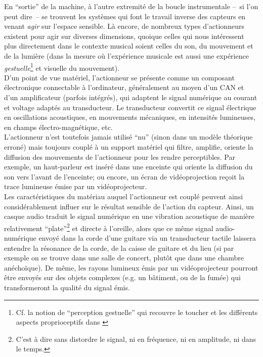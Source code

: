 \noindent En ``sortie'' de la machine, à l'autre extremité de la boucle instrumentale --~si l'on peut dire~-- se trouvent les systèmes qui font le travail inverse des capteurs en venant \textit{agir} sur l'espace sensible. Là encore, de nombreux types d'actionneurs existent pour agir sur diverses dimensions, quoique celles qui nous intéressent plus directement dans le contexte musical soient celles du son, du mouvement et de la lumière (dans la mesure où l'expérience musicale est aussi une expérience \textit{gestuelle}\footnote{Cf. la notion de ``perception gestuelle'' qui recouvre le toucher et les différents aspects proprioceptifs dans \cite{cadoz_synthese_1981}} et visuelle du mouvement).\\
\indent D'un point de vue matériel, l'actionneur se présente comme un composant électronique connectable à l'ordinateur, généralement au moyen d'un \gls{CAN} et d'un amplificateur (parfois intégrés), qui adaptent le signal numérique au courant et voltage adaptés au transducteur. Le transducteur convertit ce signal électrique en oscillations acoustiques, en mouvements mécaniques, en intensités lumineuses, en champs électro-magnétique, etc.\\
\indent L'actionneur n'est toutefois jamais utilisé ``nu'' (sinon dans un modèle théorique erroné) mais toujours couplé à un support matériel qui filtre, amplifie, oriente la diffusion des mouvements de l'actionneur pour les rendre perceptibles. Par exemple, un haut-parleur est inséré dans une enceinte qui oriente la diffusion du son vers l'avant de l'enceinte; ou encore, un écran de vidéoprojection reçoit la trace lumineuse émise par un vidéoprojecteur.\\
\indent Les caractéristiques du matériau auquel l'actionneur est couplé peuvent ainsi considérablement influer sur le résultat sensible de l'action du capteur. Ainsi, un casque audio traduit le signal numérique en une vibration acoustique de manière relativement ``plate''\footnote{C'est à dire sans distordre le signal, ni en fréquence, ni en amplitude, ni dans le temps.} et directe à l'oreille, alors que ce même signal audio-numérique envoyé dans la corde d'une guitare via un transducteur tactile laissera entendre la résonance de la corde, de la caisse de guitare et du lieu (si par exemple on se trouve dans une salle de concert, plutôt que dans une chambre anéchoïque). De même, les rayons lumineux émis par un vidéoprojecteur pourront être envoyés sur des objets complexes (e.g. un bâtiment, ou de la fumée) qui transformeront la qualité du signal émis.\\
